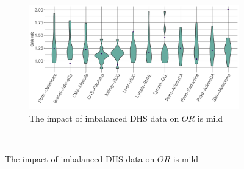 \begin{figure}[ht!]
    \begin{subfigure}{\textwidth}
    \centering
    \includegraphics[scale=0.5]{graphics/mixed_or_violin.pdf}
    \caption{The impact of imbalanced DHS data on $OR$ is mild}
    \label{fig:mixed_or_violin}
    \end{subfigure} \\
    

\end{figure}
